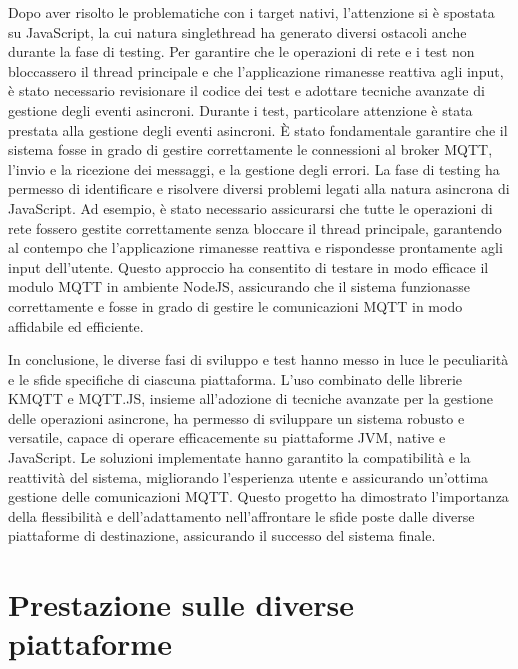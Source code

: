 \documentclass[12pt,a4paper,openright,twoside]{book}
\begin{document}
Dopo aver risolto le problematiche con i target nativi, l'attenzione si è spostata su JavaScript, la cui natura singlethread ha generato diversi ostacoli anche durante 
la fase di testing. Per garantire che le operazioni di rete e i test non bloccassero il thread principale e che l'applicazione rimanesse reattiva agli input, 
è stato necessario revisionare il codice dei test e adottare tecniche avanzate di gestione degli eventi asincroni. 
Durante i test, particolare attenzione è stata prestata alla gestione degli eventi asincroni. È stato fondamentale garantire che il sistema fosse in grado di gestire 
correttamente le connessioni al broker \ac{MQTT}, l'invio e la ricezione dei messaggi, e la gestione degli errori. La fase di testing ha permesso di identificare e 
risolvere diversi problemi legati alla natura asincrona di JavaScript. Ad esempio, è stato necessario assicurarsi che tutte le operazioni di rete fossero gestite 
correttamente senza bloccare il thread principale, garantendo al contempo che l'applicazione rimanesse reattiva e rispondesse prontamente agli input dell'utente. 
Questo approccio ha consentito di testare in modo efficace il modulo \ac{MQTT} in ambiente NodeJS, assicurando che il sistema funzionasse correttamente e fosse in grado 
di gestire le comunicazioni \ac{MQTT} in modo affidabile ed efficiente.

In conclusione, le diverse fasi di sviluppo e test hanno messo in luce le peculiarità e le sfide specifiche di ciascuna piattaforma. 
L'uso combinato delle librerie KMQTT e MQTT.JS, insieme all'adozione di tecniche avanzate per la gestione delle operazioni asincrone, 
ha permesso di sviluppare un sistema robusto e versatile, capace di operare efficacemente su piattaforme \ac{JVM}, native e JavaScript. 
Le soluzioni implementate hanno garantito la compatibilità e la reattività del sistema, migliorando l'esperienza utente e assicurando un'ottima 
gestione delle comunicazioni \ac{MQTT}. Questo progetto ha dimostrato l'importanza della flessibilità e dell'adattamento nell'affrontare le sfide 
poste dalle diverse piattaforme di destinazione, assicurando il successo del sistema finale.

\section{Prestazione sulle diverse piattaforme}
\end{document}
